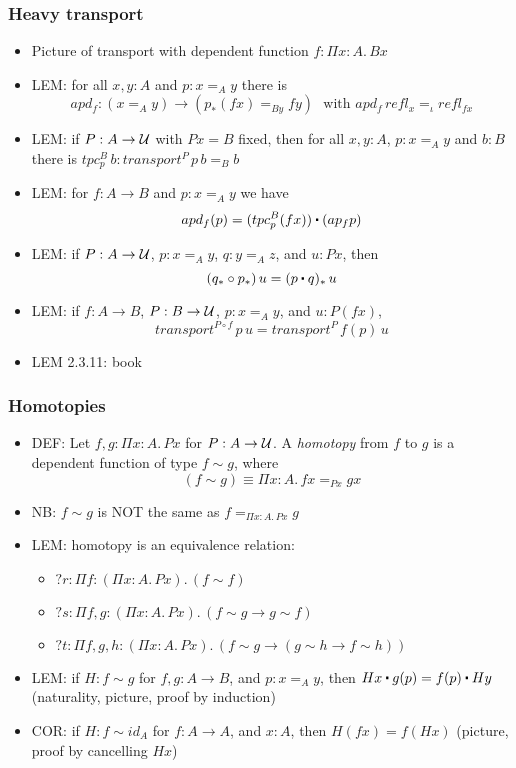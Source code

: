 \documentclass[handout]{beamer}
\newcommand{\depi}[3]{\Pi{#1{:}#2.\,#3}}
\newcommand{\UU}{{\cal U}}
\newcommand{\ct}{%
  \mathchoice{\mathbin{\raisebox{0.5ex}{$\displaystyle\centerdot$}}}%
             {\mathbin{\raisebox{0.5ex}{$\centerdot$}}}%
             {\mathbin{\raisebox{0.25ex}{$\scriptstyle\,\centerdot\,$}}}%
             {\mathbin{\raisebox{0.1ex}{$\scriptscriptstyle\,\centerdot\,$}}}
}
\begin{document}
\frame
  {

    \frametitle{Heavy transport}

    \begin{itemize}[<+->]
    \item Picture of transport with dependent function $f:\depi{x}{A}{Bx}$
    \item LEM: for all $x,y:A$ and $p:x=_A y$ there is 
               $$apd_f: (x=_A y)\to(p_*(f x) =_{By} f y)\text{~~with~}apd_f\,refl_x =_\iota refl_{fx}$$

    \item LEM: if $P:A\to\UU$ with $Px=B$ fixed, 
    then for all $x,y:A$, $p:x=_A y$ and $b:B$ there is $tpc^B_p\, b : transport^P\,p\,b =_B b$
    \item LEM: for $f:A\to B$ and $p:x=_A y$ we have $$apd_f(p) = (tpc^B_p(fx))\ct (ap_f p)$$
    \item LEM: if $P:A\to\UU$, $p:x=_A y$, $q:y=_A z$, and $u:Px$, then
               $$(q_*\circ p_*)\, u = (p\ct q)_*\, u$$
    \item LEM: if $f:A\to B$, $P:B\to\UU$, $p:x=_A y$, and $u:P(fx)$,
               $$transport^{P\circ f}\,p\,u =  transport^{P}\,f(p)\,u$$
    \item LEM 2.3.11: book
    \end{itemize}
  }

\frame
  {

    \frametitle{Homotopies}

    \begin{itemize}[<+->]
    \item DEF: Let $f,g:\depi{x}{A}{Px}$ for $P:A\to\UU$. 
    A \emph{homotopy} from $f$ to $g$ is a dependent function of type $f\sim g$, where
    $$(f\sim g) \equiv \depi{x}{A}{fx =_{Px} gx}$$
    \item NB: $f\sim g$ is NOT the same as $f=_{\depi{x}{A}{Px}} g$
    \item LEM: homotopy is an equivalence relation:
      \begin{itemize}[<+->]
      \item $?r: \depi{f}{(\depi{x}{A}{Px})}{(f\sim f)}$
      \item $?s: \depi{f,g}{(\depi{x}{A}{Px})}{(f\sim g \to g\sim f)}$
      \item $?t: \depi{f,g,h}{(\depi{x}{A}{Px})}{(f\sim g \to (g\sim h \to f\sim h))}$
      \end{itemize}
    \item LEM: if $H:f\sim g$ for $f,g:A\to B$, and $p:x=_A y$, 
          then $Hx\ct g(p) = f(p)\ct Hy$ (naturality, picture, proof by induction)
    \item COR: if $H:f\sim id_A$ for $f:A\to A$, and $x:A$, 
          then $H(fx) = f(Hx)$ (picture, proof by cancelling $Hx$)
    \end{itemize}
  }
\end{document}
